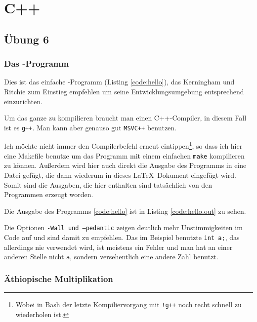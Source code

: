 
\part{C++}

\chapter{Übung 6}

\section{Das -Programm}

Dies ist das einfache -Programm (Listing \ref{code:hello}), das Kerningham und Ritchie zum Einstieg empfehlen um seine Entwicklungsumgebung entsprechend einzurichten.


Um das ganze zu kompilieren braucht man einen C++-Compiler, in diesem Fall ist es \texttt{g++}. Man kann aber genauso gut \texttt{MSVC++} benutzen.

Ich möchte nicht immer den Compilerbefehl erneut eintippen\footnote{Wobei in Bash der letzte Kompiliervorgang mit \texttt{!g++} noch recht schnell zu wiederholen ist.}, so dass ich hier eine Makefile benutze um das Programm mit einem einfachen \texttt{make} kompilieren zu können. Außerdem wird hier auch direkt die Ausgabe des Programms in eine Datei gefügt, die dann wiederum in dieses \LaTeX\ Dokument eingefügt wird. Somit sind die Ausgaben, die hier enthalten sind tatsächlich von den Programmen erzeugt worden.


Die Ausgabe des Programms \ref{code:hello} ist in Listing \ref{code:hello.out} zu sehen.


Die Optionen \texttt{-Wall und --pedantic} zeigen deutlich mehr Unstimmigkeiten im Code auf und sind damit zu empfehlen. Das im Beispiel benutzte \texttt{int a;}, das allerdings nie verwendet wird, ist meistens ein Fehler und man hat an einer anderen Stelle nicht \texttt{a}, sondern versehentlich eine andere Zahl benutzt.

\section{Äthiopische Multiplikation}
\label{section:ethiopian}

